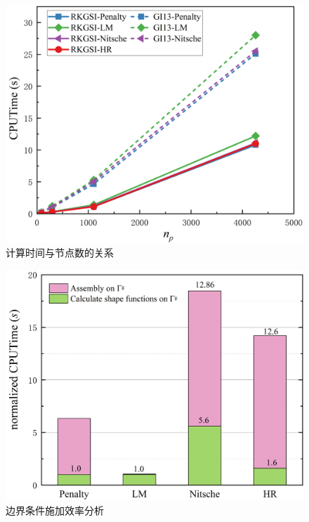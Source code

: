 \newpage
\begin{figure}[H]
    \centering
    \includegraphics[scale=0.5]{figure/EHR/cantilever/cputime.png}
    \caption{计算时间与节点数的关系}\label{Ccputime}
\end{figure}

\begin{figure}[H]
    \centering
    \includegraphics[scale=0.5]{figure/EHR/cantilever/efficiency.png}
    \caption{边界条件施加效率分析}\label{Cefficiency}
\end{figure}
